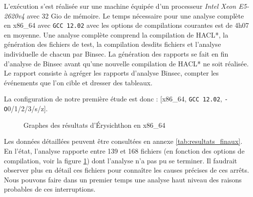 L'exécution s'est réalisée sur une machine équipée d'un processeur \textit{Intel Xeon E5-2620v4} avec 32 Gio de mémoire. Le temps nécessaire pour une analyse complète en x86\_64 avec \texttt{GCC 12.02} avec les options de compilations courantes est de 4h07 en moyenne. Une analyse complète comprend la compilation de HACL*, la génération des fichiers de test, la compilation desdits fichiers et l'analyse individuelle de chacun par Binsec. La génération des rapports se fait en fin d'analyse de Binsec avant qu'une nouvelle compilation de HACL* ne soit réalisée. Le rapport consiste à agréger les rapports d'analyse Binsec, compter les événements que l'on cible et dresser des tableaux.\medbreak

La configuration de notre première étude est donc : [x86\_64, \texttt{GCC 12.02}, \texttt{-O}0/1/2/3/s/z].\medbreak

\begin{figure}[!ht]
  \centering
  \caption{Graphes des résultats d'Érysichthon en x86\_64}
  \label{fig:graphe_total}
\end{figure}


Les données détaillées peuvent être consultées en annexe \ref{tab:resultats_finaux}. En l'état, l'analyse rapporte entre 139 et 168 fichiers (en fonction des options de compilation, voir la figure \ref{fig:graphe_total}) dont l'analyse n'a pas pu se terminer. Il faudrait observer plus en détail ces fichiers pour connaître les causes précises de ces arrêts. Nous pouvons faire dans un premier temps une analyse haut niveau des raisons probables de ces interruptions. \medbreak

